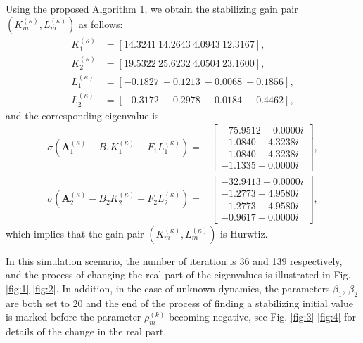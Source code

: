 \documentclass[journal]{IEEEtran}
\begin{document}
Using the proposed Algorithm 1, we obtain the stabilizing gain pair $({K}_{m}^{(\kappa)},{L}_{m}^{(\kappa)})$ as follows:
\begin{align*}
	{K}^{(\kappa)}_{1}&=[14.3241~ 14.2643 ~ 4.0943~ 12.3167],\\
	{K}^{(\kappa)}_{2}&=[19.5322~   25.6232~ 4.0504~ 23.1600],\\
	{L}^{(\kappa)}_{1}&=[-0.1827 ~ -0.1213 ~ -0.0068 ~ -0.1856],\\
	{L}^{(\kappa)}_{2}&=[-0.3172~   -0.2978~   -0.0184~  -0.4462],
\end{align*}
and the corresponding eigenvalue is
\begin{align*}
	\sigma(\mathbf{A}_{1}^{(\kappa)}-B_{1}{K}^{(\kappa)}_{1}+F_{1}{L}^{(\kappa)}_{1})
	=&\left[ \begin{matrix}  -75.9512 + 0.0000i\\
		-1.0840 + 4.3238i\\
		-1.0840 - 4.3238i\\
		-1.1335 + 0.0000i \end{matrix} \right],\nonumber\\
	\sigma(\mathbf{A}_{2}^{(\kappa)}-B_{2}{K}^{(\kappa)}_{2}+F_{2}{L}^{(\kappa)}_{2})
	=&\left[ \begin{matrix}   -32.9413 + 0.0000i\\
		-1.2773 + 4.9580i\\
		-1.2773 - 4.9580i\\
		-0.9617 + 0.0000i\end{matrix} \right],	
\end{align*}
which implies that the gain pair $({K}_{m}^{(\kappa)},{L}_{m}^{(\kappa)})$  is Hurwtiz.

In this simulation scenario, the number of iteration is 36 and 139 respectively, and the process of changing the real part of the eigenvalues is illustrated in Fig. \ref{fig:1}-\ref{fig:2}. In addition, in the case of unknown dynamics, the parameters $\beta_{1}$, $\beta_{2}$ are both set to $20$ and the end of the process of finding a stabilizing initial value is marked before the parameter $\rho^{(k)} _{m}$ becoming negative, see Fig. \ref{fig:3}-\ref{fig:4} for details of the change in the real part.
\end{document}
